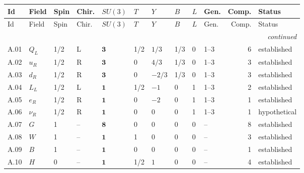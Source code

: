 {\scriptsize\setlength{\tabcolsep}{3pt}
\begin{longtable}{@{}llllllllllrl@{}}
\toprule
Id & Field & Spin & Chir. & $SU(3)$ & $T$ & $Y$ & $B$ & $L$ & Gen. & Comp. & Status \\
\midrule\endfirsthead
\toprule
Id & Field & Spin & Chir. & $SU(3)$ & $T$ & $Y$ & $B$ & $L$ & Gen. & Comp. & Status \\
\midrule\endhead
\midrule\multicolumn{12}{r}{\emph{continued}}\\\endfoot
\bottomrule\endlastfoot
A.01 & $Q_L$ & 1/2 & L & $\mathbf{3}$ & 1/2 & $1/3$ & 1/3 & 0 & 1--3 & 6 & established \\
A.02 & $u_R$ & 1/2 & R & $\mathbf{3}$ & 0 & $4/3$ & 1/3 & 0 & 1--3 & 3 & established \\
A.03 & $d_R$ & 1/2 & R & $\mathbf{3}$ & 0 & $-2/3$ & 1/3 & 0 & 1--3 & 3 & established \\
A.04 & $L_L$ & 1/2 & L & $\mathbf{1}$ & 1/2 & $-1$ & 0 & 1 & 1--3 & 2 & established \\
A.05 & $e_R$ & 1/2 & R & $\mathbf{1}$ & 0 & $-2$ & 0 & 1 & 1--3 & 1 & established \\
A.06 & $\nu_R$ & 1/2 & R & $\mathbf{1}$ & 0 & $0$ & 0 & 1 & 1--3 & 1 & hypothetical \\
A.07 & $G$ & 1 & -- & $\mathbf{8}$ & 0 & $0$ & 0 & 0 & -- & 8 & established \\
A.08 & $W$ & 1 & -- & $\mathbf{1}$ & 1 & $0$ & 0 & 0 & -- & 3 & established \\
A.09 & $B$ & 1 & -- & $\mathbf{1}$ & 0 & $0$ & 0 & 0 & -- & 1 & established \\
A.10 & $H$ & 0 & -- & $\mathbf{1}$ & 1/2 & $1$ & 0 & 0 & -- & 4 & established \\
\end{longtable}}
